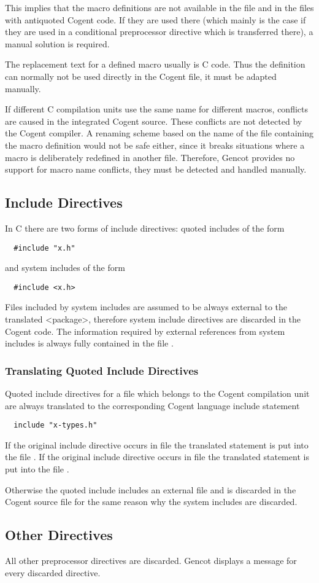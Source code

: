 This implies that the macro definitions are not available in the file
 and in the files with
antiquoted Cogent code. If they are used there (which mainly is the case if they are used in a conditional
preprocessor directive which is transferred there), a manual solution is required. 

The replacement text for a defined macro usually is C code. Thus the definition can normally not be used directly in
the Cogent file, it must be adapted manually. 

If different C compilation units use the same name for different macros, conflicts are caused in the integrated Cogent
source. These conflicts are not detected by the Cogent compiler. A renaming scheme based on the name of the file 
containing the macro definition would not be safe either, since it breaks situations where a macro is deliberately
redefined in another file. Therefore, Gencot provides no support for macro name conflicts, they must be detected and
handled manually.

\subsection{Include Directives}

In C there are two forms of include directives: quoted includes of the form
\begin{verbatim}
  #include "x.h"
\end{verbatim}
and system includes of the form
\begin{verbatim}
  #include <x.h>
\end{verbatim}
Files included by system includes are assumed to be always external to the translated <package>, therefore system
include directives are discarded in the Cogent code. The information required by external references from system 
includes is always fully contained in the file .

\subsubsection{Translating Quoted Include Directives}

Quoted include directives for a file  which belongs to the Cogent compilation unit are always translated 
to the corresponding Cogent language include statement
\begin{verbatim}
  include "x-types.h"
\end{verbatim}
If the original include directive occurs in file  the translated statement is put into the file 
. If the original include directive occurs in file  the translated statement is put into the file
. 

Otherwise the quoted include includes an external file and is discarded in the Cogent source file for the same reason
why the system includes are discarded.

\subsection{Other Directives}

All other preprocessor directives are discarded. Gencot displays a message for every discarded directive.

 
